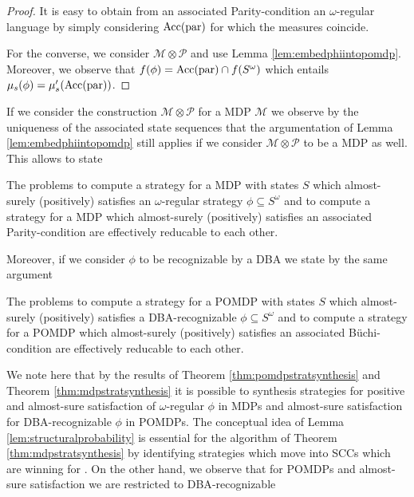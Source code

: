\begin{proof}
  It is easy to obtain from an associated Parity-condition an $\omega$-regular
  language by simply considering $\operatorname{Acc}(\operatorname{par})$ for which the measures
  coincide.

  For the converse, we consider $\mathcal{M}\otimes\mathcal{P}$ and use Lemma
  \ref{lem:embedphiintopomdp}. Moreover, we observe that
  $f(\phi) = \operatorname{Acc}(\operatorname{par})\cap f(S^{\omega})$ which entails
  $\mu_{s}(\phi) = \mu_{s}'(\operatorname{Acc}(\operatorname{par}))$.
\end{proof}

If we consider the construction $\mathcal{M}\otimes\mathcal{P}$ for a \ac{MDP}
$\mathcal{M}$ we observe by the uniqueness of the associated state sequences
that the argumentation of Lemma \ref{lem:embedphiintopomdp} still applies if we
consider $\mathcal{M}\otimes\mathcal{P}$ to be a \ac{MDP} as well. This allows
to state
\begin{corollary}
  The problems to compute a strategy for a \ac{MDP} with states $S$ which
  almost-surely (positively) satisfies an $\omega$-regular strategy
  $\phi\subseteq S^{\omega}$ and to compute a strategy for a \ac{MDP} which
  almost-surely (positively) satisfies an associated Parity-condition are
  effectively reducable to each other.
  \label{thm:MDPomegareg}
\end{corollary}
Moreover, if we consider $\phi$ to be recognizable by a \ac{DBA} we state by
the same argument
\begin{corollary}
  The problems to compute a strategy for a \ac{POMDP} with states $S$ which
  almost-surely (positively) satisfies a \ac{DBA}-recognizable $\phi\subseteq
  S^{\omega}$ and to compute a strategy for a \ac{POMDP} which almost-surely
  (positively) satisfies an associated Büchi-condition are effectively
  reducable to each other.
  \label{cor:POMDPDBA}
\end{corollary}
We note here that by the results of Theorem \ref{thm:pomdpstratsynthesis} and
Theorem \ref{thm:mdpstratsynthesis} it is possible to synthesis strategies for
positive and almost-sure satisfaction of $\omega$-regular $\phi$ in \acp{MDP}
and almost-sure satisfaction for \ac{DBA}-recognizable $\phi$ in \acp{POMDP}.
The conceptual idea of Lemma \ref{lem:structuralprobability} is essential for
the algorithm of Theorem \ref{thm:mdpstratsynthesis} by identifying strategies
which move into \acp{SCC} which are winning for \eve{}
\cite{QuanStochParityGames}. On the other hand, we observe that for \acp{POMDP}
and almost-sure satisfaction we are restricted to \ac{DBA}-recognizable
